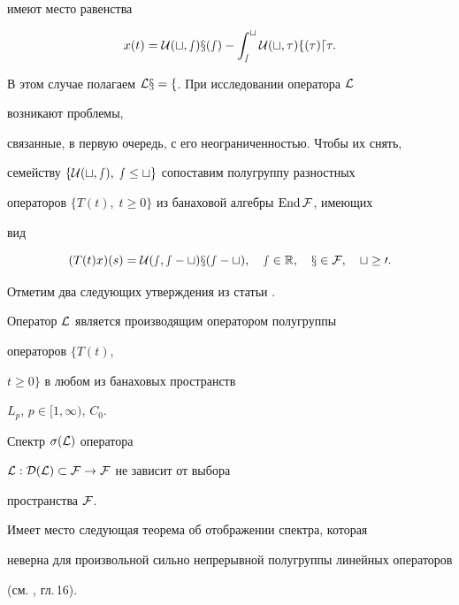 имеют место равенства 


$$ 


x(t)=\cal U(t,s)x(s)-\int^t_s \cal U(t,\tau)f(\tau)d\tau. 


$$ 


В этом случае полагаем $\cal L x=f$. При исследовании оператора $\cal L$ 


возникают проблемы, 


связанные, в первую очередь, с его неограниченностью. Чтобы их снять,


семейству $\{\cal U(t,s),\;s\le t\}$ сопоставим полугруппу разностных 


операторов $\{T(t),\;t\ge 0\}$ из банаховой алгебры $\operatorname{End}\cal F$, имеющих 


вид 


$$ 


(T(t)x)(s)=\cal U(s,s-t)x(s-t),\quad 


s\in\Bbb R,\quad x\in\cal F,\quad t\ge 0. 


$$ 


Отметим два следующих утверждения из статьи \cite{Bask2}. 


 


\begin{thm} Оператор $\cal L$ является производящим оператором полугруппы 


операторов $\{T(t)$,




$t\ge 0\}$ в любом из банаховых пространств 


$L_p$, $p\in[1,\infty)$, $C_0$. 


\end{thm} 


 


\begin{thm} Спектр $\sigma(\cal L)$ оператора 


$\cal L:D(\cal L)\subset\cal F\to\cal F$ не зависит от выбора 


пространства $\cal F$. 


\end{thm} 


 


Имеет место следующая теорема об отображении спектра, которая 


неверна для произвольной сильно непрерывной полугруппы линейных операторов 


(см. \cite{Hil}, гл.\,16). 


